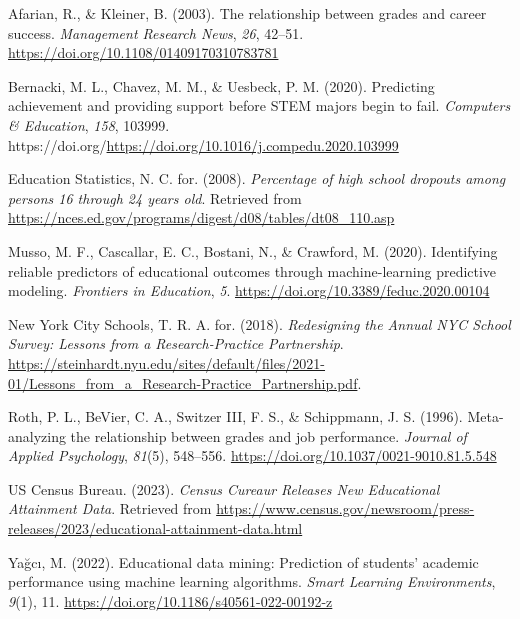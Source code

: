 \documentclass[
  man]{apa6}
\newlength{\cslhangindent}
\newlength{\cslentryspacingunit} %
\newenvironment{CSLReferences}[2] %
 {%
  \setlength{\parindent}{0pt}
  \ifodd #1
  \let\oldpar\par
  \def\par{\hangindent=\cslhangindent\oldpar}
  \fi
  \setlength{\parskip}{#2\cslentryspacingunit}
 }%
 {}
\begin{document}
\hypertarget{refs}{}
\begin{CSLReferences}{1}{0}
\leavevmode{}%
Afarian, R., \& Kleiner, B. (2003). The relationship between grades and career success. \emph{Management Research News}, \emph{26}, 42--51. \url{https://doi.org/10.1108/01409170310783781}

\leavevmode{}%
Bernacki, M. L., Chavez, M. M., \& Uesbeck, P. M. (2020). Predicting achievement and providing support before STEM majors begin to fail. \emph{Computers \& Education}, \emph{158}, 103999. https://doi.org/\url{https://doi.org/10.1016/j.compedu.2020.103999}

\leavevmode{}%
Education Statistics, N. C. for. (2008). \emph{Percentage of high school dropouts among persons 16 through 24 years old}. Retrieved from \url{https://nces.ed.gov/programs/digest/d08/tables/dt08_110.asp}

\leavevmode{}%
Musso, M. F., Cascallar, E. C., Bostani, N., \& Crawford, M. (2020). Identifying reliable predictors of educational outcomes through machine-learning predictive modeling. \emph{Frontiers in Education}, \emph{5}. \url{https://doi.org/10.3389/feduc.2020.00104}

\leavevmode{}%
New York City Schools, T. R. A. for. (2018). \emph{{R}edesigning the {A}nnual {N}{Y}{C} {S}chool {S}urvey: {L}essons from a {R}esearch-{P}ractice {P}artnership}. \url{https://steinhardt.nyu.edu/sites/default/files/2021-01/Lessons_from_a_Research-Practice_Partnership.pdf}.

\leavevmode{}%
Roth, P. L., BeVier, C. A., Switzer III, F. S., \& Schippmann, J. S. (1996). Meta-analyzing the relationship between grades and job performance. \emph{Journal of Applied Psychology}, \emph{81}(5), 548--556. \url{https://doi.org/10.1037/0021-9010.81.5.548}

\leavevmode{}%
US Census Bureau. (2023). \emph{Census {Cureaur} {Releases} {New} {Educational} {Attainment} {Data}}. Retrieved from \url{https://www.census.gov/newsroom/press-releases/2023/educational-attainment-data.html}

\leavevmode{}%
Yağcı, M. (2022). Educational data mining: Prediction of students' academic performance using machine learning algorithms. \emph{Smart Learning Environments}, \emph{9}(1), 11. \url{https://doi.org/10.1186/s40561-022-00192-z}

\end{CSLReferences}
\end{document}
